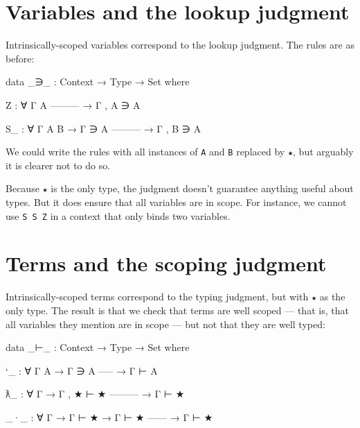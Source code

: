 \hypertarget{variables-and-the-lookup-judgment}{%
\section{Variables and the lookup
judgment}\label{variables-and-the-lookup-judgment}}

Intrinsically-scoped variables correspond to the lookup judgment. The
rules are as before:

\begin{fence}
\begin{code}
data _∋_ : Context → Type → Set where

  Z : ∀ {Γ A}
     ---------
   → Γ , A ∋ A

  S_ : ∀ {Γ A B}
    → Γ ∋ A
      ---------
    → Γ , B ∋ A
\end{code}
\end{fence}

We could write the rules with all instances of \texttt{A} and \texttt{B}
replaced by \texttt{★}, but arguably it is clearer not to do so.

Because \texttt{★} is the only type, the judgment doesn't guarantee
anything useful about types. But it does ensure that all variables are
in scope. For instance, we cannot use \texttt{S\ S\ Z} in a context that
only binds two variables.

\hypertarget{terms-and-the-scoping-judgment}{%
\section{Terms and the scoping
judgment}\label{terms-and-the-scoping-judgment}}

Intrinsically-scoped terms correspond to the typing judgment, but with
\texttt{★} as the only type. The result is that we check that terms are
well scoped --- that is, that all variables they mention are in scope
--- but not that they are well typed:

\begin{fence}
\begin{code}
data _⊢_ : Context → Type → Set where

  `_ : ∀ {Γ A}
    → Γ ∋ A
      -----
    → Γ ⊢ A

  ƛ_  :  ∀ {Γ}
    → Γ , ★ ⊢ ★
      ---------
    → Γ ⊢ ★

  _·_ : ∀ {Γ}
    → Γ ⊢ ★
    → Γ ⊢ ★
      ------
    → Γ ⊢ ★
\end{code}
\end{fence}

